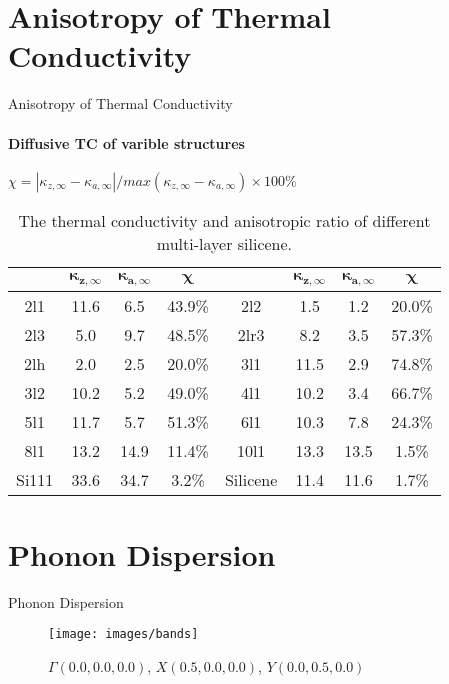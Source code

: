 \documentclass{beamer}
\begin{document}
\section{Anisotropy of Thermal Conductivity}
\begin{frame}{Anisotropy of Thermal Conductivity}
  \framesubtitle{Diffusive TC of varible structures}%
  $ \chi=|\kappa_{z,\infty}-\kappa_{a,\infty} |/max⁡(\kappa_{z,\infty}-\kappa_{a,\infty} ) \times 100 \%$
  \begin{table}[!b]
    {\carlitoTLF %
      \begin{tabular}{cccccccc}
              & \textbf{$\mathbf{\kappa_{z,\infty}}$}
              & \textbf{$\mathbf{\kappa_{a,\infty}}$}
              & \textbf{$\mathbf{\chi}$}
              &
              & \textbf{$\mathbf{\kappa_{z,\infty}}$}
              & \textbf{$\mathbf{\kappa_{a,\infty}}$}
              & \textbf{$\mathbf{\chi}$}                                                                \\
        \toprule
        2l1   & 11.6                                  & 6.5  & 43.9\% & 2l2      & 1.5  & 1.2  & 20.0\% \\
        2l3   & 5.0                                   & 9.7  & 48.5\% & 2lr3     & 8.2  & 3.5  & 57.3\% \\
        2lh   & 2.0                                   & 2.5  & 20.0\% & 3l1      & 11.5 & 2.9  & 74.8\% \\
        3l2   & 10.2                                  & 5.2  & 49.0\% & 4l1      & 10.2 & 3.4  & 66.7\% \\
        5l1   & 11.7                                  & 5.7  & 51.3\% & 6l1      & 10.3 & 7.8  & 24.3\% \\
        8l1   & 13.2                                  & 14.9 & 11.4\% & 10l1     & 13.3 & 13.5 & 1.5\%  \\
        Si111 & 33.6                                  & 34.7 & 3.2\%  & Silicene & 11.4 & 11.6 & 1.7\%  \\
        \bottomrule
      \end{tabular}
    }
    \caption{
      The thermal conductivity and anisotropic ratio of different multi-layer silicene.}
  \end{table}

\end{frame}

\section{Phonon Dispersion}
\begin{frame}{Phonon Dispersion}
  \begin{figure}[b]
    \texttt{[image: images/bands]}
    \caption{\label{fig:bands} $\Gamma(0.0, 0.0, 0.0)$, $X(0.5, 0.0, 0.0)$,  $Y(0.0, 0.5, 0.0)$}
  \end{figure}
\end{frame}
\end{document}
